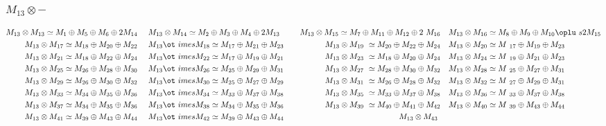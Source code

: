 \subsubsection{$M_13\otimes -$}
\begin{align*}
M_{13} \otimes M_{13} \simeq M_{1} \oplus M_{5} \oplus M_{6} \oplus 2 M_{14} &\
&& M_{13} \otimes M_{14} \simeq M_{2} \oplus M_{3} \oplus M_{4} \oplus 2 M_{13\
} &&& M_{13} \otimes M_{15} \simeq M_{7} \oplus M_{11} \oplus M_{12} \oplus 2 \
M_{16} &&& M_{13} \otimes M_{16} \simeq M_{8} \oplus M_{9} \oplus M_{10} \oplu\
s 2 M_{15}\\
M_{13} \otimes M_{17} \simeq M_{18} \oplus M_{20} \oplus M_{22} &&& M_{13} \ot\
imes M_{18} \simeq M_{17} \oplus M_{21} \oplus M_{23} &&& M_{13} \otimes M_{19\
} \simeq M_{20} \oplus M_{22} \oplus M_{24} &&& M_{13} \otimes M_{20} \simeq M\
_{17} \oplus M_{19} \oplus M_{23}\\
M_{13} \otimes M_{21} \simeq M_{18} \oplus M_{22} \oplus M_{24} &&& M_{13} \ot\
imes M_{22} \simeq M_{17} \oplus M_{19} \oplus M_{21} &&& M_{13} \otimes M_{23\
} \simeq M_{18} \oplus M_{20} \oplus M_{24} &&& M_{13} \otimes M_{24} \simeq M\
_{19} \oplus M_{21} \oplus M_{23}\\
M_{13} \otimes M_{25} \simeq M_{26} \oplus M_{28} \oplus M_{30} &&& M_{13} \ot\
imes M_{26} \simeq M_{25} \oplus M_{29} \oplus M_{31} &&& M_{13} \otimes M_{27\
} \simeq M_{28} \oplus M_{30} \oplus M_{32} &&& M_{13} \otimes M_{28} \simeq M\
_{25} \oplus M_{27} \oplus M_{31}\\
M_{13} \otimes M_{29} \simeq M_{26} \oplus M_{30} \oplus M_{32} &&& M_{13} \ot\
imes M_{30} \simeq M_{25} \oplus M_{27} \oplus M_{29} &&& M_{13} \otimes M_{31\
} \simeq M_{26} \oplus M_{28} \oplus M_{32} &&& M_{13} \otimes M_{32} \simeq M\
_{27} \oplus M_{29} \oplus M_{31}\\
M_{13} \otimes M_{33} \simeq M_{34} \oplus M_{35} \oplus M_{36} &&& M_{13} \ot\
imes M_{34} \simeq M_{33} \oplus M_{37} \oplus M_{38} &&& M_{13} \otimes M_{35\
} \simeq M_{33} \oplus M_{37} \oplus M_{38} &&& M_{13} \otimes M_{36} \simeq M\
_{33} \oplus M_{37} \oplus M_{38}\\
M_{13} \otimes M_{37} \simeq M_{34} \oplus M_{35} \oplus M_{36} &&& M_{13} \ot\
imes M_{38} \simeq M_{34} \oplus M_{35} \oplus M_{36} &&& M_{13} \otimes M_{39\
} \simeq M_{40} \oplus M_{41} \oplus M_{42} &&& M_{13} \otimes M_{40} \simeq M\
_{39} \oplus M_{43} \oplus M_{44}\\
M_{13} \otimes M_{41} \simeq M_{39} \oplus M_{43} \oplus M_{44} &&& M_{13} \ot\
imes M_{42} \simeq M_{39} \oplus M_{43} \oplus M_{44} &&& M_{13} \otimes M_{43\
}
\end{align*}
